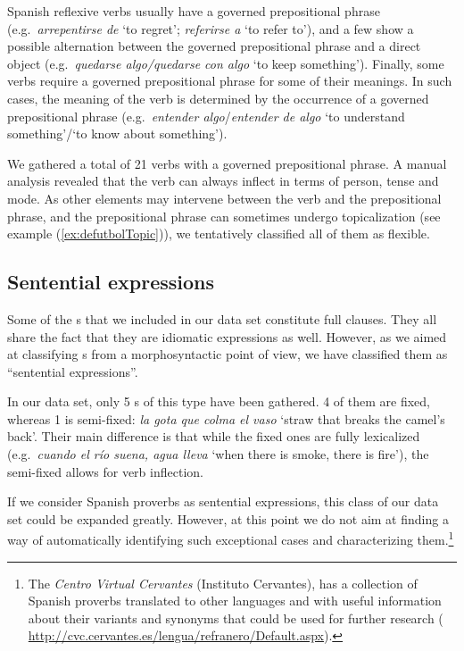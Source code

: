 \documentclass[output=paper]{langsci/langscibook}
\begin{document}
Spanish reflexive verbs usually have a governed prepositional phrase (e.g.\ \textit{arrepentirse de} `to regret'; \textit{referirse a} `to refer to'), and a few show a possible alternation between the governed prepositional phrase and a direct object (e.g.\ \textit{quedarse algo/quedarse con algo} `to keep something').
Finally, some verbs require a governed prepositional phrase for some of their meanings.
In such cases, the meaning of the verb is determined by the occurrence of a governed prepositional phrase (e.g.\ \textit{entender algo}/\textit{entender de algo} `to understand something'/`to know about something').

We gathered a total of 21 verbs with a governed prepositional phrase.
A manual analysis revealed that the verb can always inflect in terms of person, tense and mode. 
As other elements may intervene between the verb and the prepositional phrase, and the prepositional phrase can sometimes undergo topicalization (see example (\ref{ex:defutbolTopic})), we tentatively classified all of them as flexible.

\subsection{Sentential expressions}
\label{ssec:sentential-expressions}

Some of the \mwe s that we included in our data set constitute full clauses.
They all share the fact that they are idiomatic expressions as well. 
However, as we aimed at classifying \mwe s from a morphosyntactic point of view, we have classified them as ``sentential expressions''.

In our data set, only 5 \mwe s of this type have been gathered.
4 of them are fixed, whereas 1 is semi-fixed: \textit{la gota que colma el vaso} `straw that breaks the camel's back'.
Their main difference is that while the fixed ones are fully lexicalized (e.g.\ \textit{cuando el río suena, agua lleva} `when there is smoke, there is fire'), the semi-fixed allows for verb inflection.

If we consider Spanish proverbs as sentential expressions, this class of our data set could be expanded greatly.
However, at this point we do not aim at finding a way of automatically identifying such exceptional cases and characterizing them.\footnote{The \textit{Centro Virtual Cervantes} (Instituto Cervantes), has a collection of Spanish proverbs translated to other languages and with useful information about their variants and synonyms that could be used for further research ( \href{http://cvc.cervantes.es/lengua/refranero/Default.aspx}{http://cvc.cervantes.es/lengua/refranero/Default.aspx}).}
\end{document}

